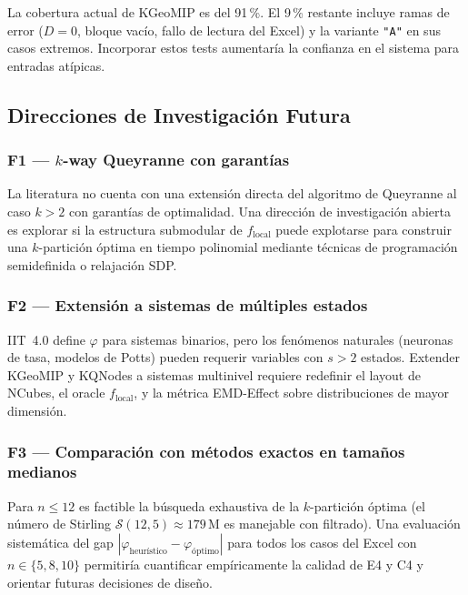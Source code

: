 La cobertura actual de KGeoMIP es del 91\,\%.
El 9\,\% restante incluye ramas de error ($D=0$, bloque vacío, fallo de
lectura del Excel) y la variante \texttt{"A"} en sus casos extremos.
Incorporar estos tests aumentaría la confianza en el sistema para entradas
atípicas.

\subsection{Direcciones de Investigación Futura}

\subsubsection*{F1 — $k$-way Queyranne con garantías}

La literatura no cuenta con una extensión directa del algoritmo de
Queyranne al caso $k > 2$ con garantías de optimalidad.
Una dirección de investigación abierta es explorar si la estructura
submodular de $f_{\text{local}}$ puede explotarse para construir una
$k$-partición óptima en tiempo polinomial mediante técnicas de
programación semidefinida o relajación SDP.

\subsubsection*{F2 — Extensión a sistemas de múltiples estados}

IIT~4.0 define $\varphi$ para sistemas binarios, pero los fenómenos
naturales (neuronas de tasa, modelos de Potts) pueden requerir variables
con $s > 2$ estados.
Extender KGeoMIP y KQNodes a sistemas multinivel requiere redefinir el
layout de NCubes, el oracle $f_{\text{local}}$, y la métrica EMD-Effect
sobre distribuciones de mayor dimensión.

\subsubsection*{F3 — Comparación con métodos exactos en tamaños medianos}

Para $n \leq 12$ es factible la búsqueda exhaustiva de la $k$-partición
óptima (el número de Stirling $\mathcal{S}(12, 5) \approx 179\,\text{M}$
es manejable con filtrado).
Una evaluación sistemática del gap $|\varphi_{\text{heurístico}} -
\varphi_{\text{óptimo}}|$ para todos los casos del Excel con $n \in
\{5, 8, 10\}$ permitiría cuantificar empíricamente la calidad de E4 y C4
y orientar futuras decisiones de diseño.

